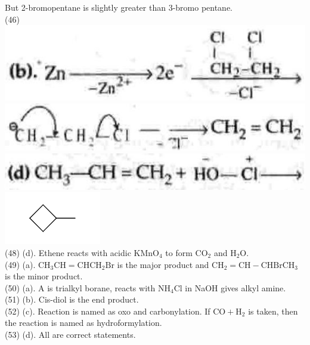 \documentclass[10pt]{article}
\begin{document}
But 2-bromopentane is slightly greater than 3-bromo pentane.\\
(46)\\
\includegraphics[max width=\textwidth, center]{2025_01_28_8470952b98110cec3aabg-243(1)}\\
\includegraphics[max width=\textwidth, center]{2025_01_28_8470952b98110cec3aabg-243(11)}\\
\includegraphics[max width=\textwidth, center]{2025_01_28_8470952b98110cec3aabg-243(7)}\\
\includegraphics{smile-ce31543d718ffa6aa19fb183ead45ebeea1099d3}\\
(48) (d). Ethene reacts with acidic $\mathrm{KMnO}_{4}$ to form $\mathrm{CO}_{2}$ and $\mathrm{H}_{2} \mathrm{O}$.\\
(49) (a). $\mathrm{CH}_{3} \mathrm{CH}=\mathrm{CHCH}_{2} \mathrm{Br}$ is the major product and $\mathrm{CH}_{2}=\mathrm{CH}-\mathrm{CHBrCH}_{3}$ is the minor product.\\
(50) (a). A is trialkyl borane, reacts with $\mathrm{NH}_{4} \mathrm{Cl}$ in NaOH gives alkyl amine.\\
(51) (b). Cis-diol is the end product.\\
(52) (c). Reaction is named as oxo and carbonylation. If $\mathrm{CO}+\mathrm{H}_{2}$ is taken, then the reaction is named as hydroformylation.\\
(53) (d). All are correct statements.\\
\end{document}
